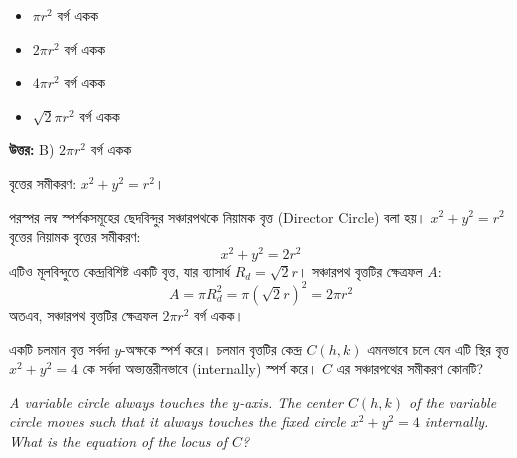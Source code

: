 \documentclass[12pt, a4paper]{article}
\begin{document}
\begin{itemize}[label={}, leftmargin=1cm, itemsep=0.5em]
    \item[\textbf{A)}] $\pi r^2$ বর্গ একক
    \item[\textbf{B)}] $2\pi r^2$ বর্গ একক
    \item[\textbf{C)}] $4\pi r^2$ বর্গ একক
    \item[\textbf{D)}] $\sqrt{2}\pi r^2$ বর্গ একক
\end{itemize}

\vspace{0.5em}
\begin{tcolorbox}[answerbox]
    \textbf{\color{success} উত্তর:} B) $2\pi r^2$ বর্গ একক
\end{tcolorbox}
\vspace{1em}

\begin{tcolorbox}[solutionbox={সমাধান (Solution)}]
    \noindent
    বৃত্তের সমীকরণ: $x^2 + y^2 = r^2$। 
    
    \vspace{0.5em}
    পরস্পর লম্ব স্পর্শকসমূহের ছেদবিন্দুর সঞ্চারপথকে নিয়ামক বৃত্ত (Director Circle) বলা হয়। $x^2 + y^2 = r^2$ বৃত্তের নিয়ামক বৃত্তের সমীকরণ:
    \[ x^2 + y^2 = 2r^2 \]
    এটিও মূলবিন্দুতে কেন্দ্রবিশিষ্ট একটি বৃত্ত, যার ব্যাসার্ধ $R_d = \sqrt{2}r$। 
    সঞ্চারপথ বৃত্তটির ক্ষেত্রফল $A$:
    \[ A = \pi R_d^2 = \pi (\sqrt{2}r)^2 = 2\pi r^2 \]
    অতএব, সঞ্চারপথ বৃত্তটির ক্ষেত্রফল $2\pi r^2$ বর্গ একক।
\end{tcolorbox}

\begin{tcolorbox}[questionbox={প্রশ্ন (Question) 31}]
    \noindent
    একটি চলমান বৃত্ত সর্বদা $y$-অক্ষকে স্পর্শ করে। চলমান বৃত্তটির কেন্দ্র $C(h, k)$ এমনভাবে চলে যেন এটি স্থির বৃত্ত $x^2 + y^2 = 4$ কে সর্বদা অভ্যন্তরীনভাবে (internally) স্পর্শ করে। $C$ এর সঞ্চারপথের সমীকরণ কোনটি?
    
    \vspace{0.8em}
    \begin{english}
    \noindent\textit{\color{darkgray}
    A variable circle always touches the $y$-axis. The center $C(h, k)$ of the variable circle moves such that it always touches the fixed circle $x^2 + y^2 = 4$ internally. What is the equation of the locus of $C$?
    }
    \end{english}
\end{tcolorbox}
\end{document}
